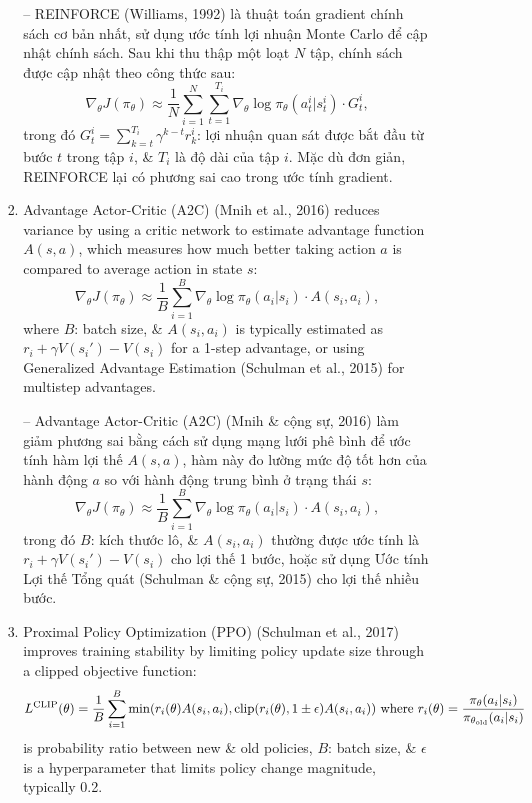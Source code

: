 \documentclass{article}
\begin{document}
\begin{itemize}
\begin{itemize}
\begin{itemize}
\begin{enumerate}
                -- REINFORCE (Williams, 1992) là thuật toán gradient chính sách cơ bản nhất, sử dụng ước tính lợi nhuận Monte Carlo để cập nhật chính sách. Sau khi thu thập một loạt $N$ tập, chính sách được cập nhật theo công thức sau:
                \begin{equation*}
                    \nabla_\theta J(\pi_\theta)\approx\frac{1}{N}\sum_{i=1}^N\sum_{t=1}^{T_i} \nabla_\theta\log\pi_\theta(a_t^i|s_t^i)\cdot G_t^i,
                \end{equation*}
                trong đó $G_t^i = \sum_{k=t}^{T_i} \gamma^{k - t}r_k^i$: lợi nhuận quan sát được bắt đầu từ bước $t$ trong tập $i$, \& $T_i$ là độ dài của tập $i$. Mặc dù đơn giản, REINFORCE lại có phương sai cao trong ước tính gradient.
                \item Advantage Actor-Critic (A2C) (Mnih et al., 2016) reduces variance by using a critic network to estimate advantage function $A(s,a)$, which measures how much better taking action $a$ is compared to average action in state $s$:
                \begin{equation*}
                    \nabla_\theta J(\pi_\theta)\approx\frac{1}{B}\sum_{i=1}^B \nabla_\theta\log\pi_\theta(a_i|s_i)\cdot A(s_i,a_i),
                \end{equation*}
                where $B$: batch size, \& $A(s_i,a_i)$ is typically estimated as $r_i + \gamma V(s_i') - V(s_i)$ for a 1-step advantage, or using Generalized Advantage Estimation (Schulman et al., 2015) for multistep advantages.

                -- Advantage Actor-Critic (A2C) (Mnih \& cộng sự, 2016) làm giảm phương sai bằng cách sử dụng mạng lưới phê bình để ước tính hàm lợi thế $A(s,a)$, hàm này đo lường mức độ tốt hơn của hành động $a$ so với hành động trung bình ở trạng thái $s$:
                \begin{equation*}
                    \nabla_\theta J(\pi_\theta)\approx\frac{1}{B}\sum_{i=1}^B \nabla_\theta\log\pi_\theta(a_i|s_i)\cdot A(s_i,a_i),
                \end{equation*}
                trong đó $B$: kích thước lô, \& $A(s_i,a_i)$ thường được ước tính là $r_i + \gamma V(s_i') - V(s_i)$ cho lợi thế 1 bước, hoặc sử dụng Ước tính Lợi thế Tổng quát (Schulman \& cộng sự, 2015) cho lợi thế nhiều bước.
                \item Proximal Policy Optimization (PPO) (Schulman et al., 2017) improves training stability by limiting policy update size through a clipped objective function:
                \begin{equation*}
                    L^{\rm CLIP}(\theta) = \frac{1}{B}\sum_{i=1}^B \min(r_i(\theta)A(s_i,a_i),{\rm clip}(r_i(\theta),1\pm\epsilon)A(s_i,a_i))\mbox{ where } r_i(\theta) = \frac{\pi_\theta(a_i|s_i)}{\pi_{\theta_{\rm old}}(a_i|s_i)}
                \end{equation*}
                is probability ratio between new \& old policies, $B$: batch size, \& $\epsilon$ is a hyperparameter that limits policy change magnitude, typically 0.2.


\end{enumerate}
\end{itemize}
\end{itemize}
\end{itemize}
\end{document}
